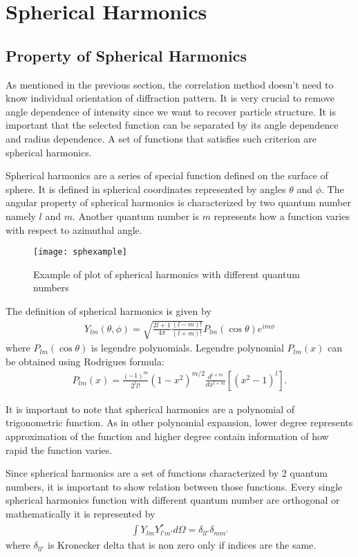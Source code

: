 \section{Spherical Harmonics}
\subsection{Property of Spherical Harmonics}
As mentioned in the previous section, the correlation method doesn't need to know individual orientation of diffraction pattern. It is very crucial to remove angle dependence of intensity since we want to recover particle structure. It is important that the selected function can be separated by its angle dependence and radius dependence. A set of functions that satisfies such criterion are spherical harmonics.

Spherical harmonics are a series of special function defined on the surface of sphere. It is defined in spherical coordinates represented by angles $\theta$ and $\phi$. The angular property of spherical harmonics is characterized by two quantum number namely $l$ and $m$. Another quantum number is $m$ represents how a function varies with respect to azimuthal angle. 

\begin{figure}[h]
  \centering
  \texttt{[image: sphexample]}
\caption{Example of plot of spherical harmonics with different quantum numbers }
\label{fig:sphexample}
\end{figure}

The definition of spherical harmonics is given by
\begin{eqnarray}
Y_{lm}(\theta,\phi)=\sqrt{\frac{2l+1}{4 \pi}\frac{(l-m)!}{(l+m)!}} P_{lm}(\cos \theta) e^{im\phi}
\label{eq:sphhar}
\end{eqnarray}
where $P_{lm}(\cos \theta)$ is legendre polynomials. Legendre polynomial $P_{lm}(x)$ can be obtained using Rodrigues formula:
\begin{eqnarray}
P_{lm}(x)=\frac{(-1)^m}{2^{l} l!} (1-x^2)^{m/2}\frac{d^{l+m}}{dx^{l+m}}\left[(x^2-1)^l\right].
\label{eq:rodfor}
\end{eqnarray}

It is important to note that spherical harmonics are a polynomial of trigonometric function. As in other polynomial expansion, lower degree represents approximation of the function and higher degree contain information of how rapid the function varies.  

Since spherical harmonics are a set of functions characterized by 2 quantum numbers, it is important to show relation between those functions. Every single spherical harmonics function with different quantum number are orthogonal or mathematically it is represented by
\begin{eqnarray}
\int Y_{lm} Y_{l'm'}^{*} d\Omega= \delta_{ll'}\delta_{mm'}
\end{eqnarray}
where $\delta_{ll'}$ is Kronecker delta that is non zero only if indices are the same. 

